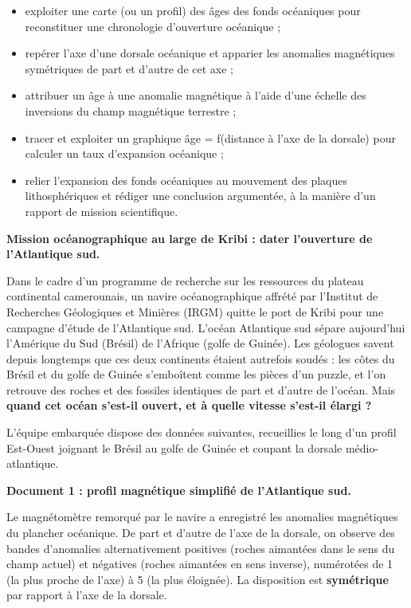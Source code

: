 \documentclass[11pt]{article}
\newcounter{popsec}
\newcounter{popsub}
\newcommand{\courssub}[1]{%
  \stepcounter{popsub}%
  \par\vspace{9pt}\noindent{\popxbold\fontsize{11.5}{13}\selectfont\color{popink}{\color{poporange}\thepopsec.\thepopsub}\hspace{6pt}#1}\par\nopagebreak\vspace{4pt}
}
\begin{document}
\begin{itemize}
\item exploiter une carte (ou un profil) des âges des fonds océaniques pour reconstituer une chronologie d'ouverture océanique ;
\item repérer l'axe d'une dorsale océanique et apparier les anomalies magnétiques symétriques de part et d'autre de cet axe ;
\item attribuer un âge à une anomalie magnétique à l'aide d'une échelle des inversions du champ magnétique terrestre ;
\item tracer et exploiter un graphique âge = f(distance à l'axe de la dorsale) pour calculer un taux d'expansion océanique ;
\item relier l'expansion des fonds océaniques au mouvement des plaques lithosphériques et rédiger une conclusion argumentée, à la manière d'un rapport de mission scientifique.
\end{itemize}

\courssub{Situation}

\textbf{Mission océanographique au large de Kribi : dater l'ouverture de l'Atlantique sud.}

Dans le cadre d'un programme de recherche sur les ressources du plateau continental camerounais, un navire océanographique affrété par l'Institut de Recherches Géologiques et Minières (IRGM) quitte le port de Kribi pour une campagne d'étude de l'Atlantique sud. L'océan Atlantique sud sépare aujourd'hui l'Amérique du Sud (Brésil) de l'Afrique (golfe de Guinée). Les géologues savent depuis longtemps que ces deux continents étaient autrefois soudés : les côtes du Brésil et du golfe de Guinée s'emboîtent comme les pièces d'un puzzle, et l'on retrouve des roches et des fossiles identiques de part et d'autre de l'océan. Mais \textbf{quand cet océan s'est-il ouvert, et à quelle vitesse s'est-il élargi ?}

L'équipe embarquée dispose des données suivantes, recueillies le long d'un profil Est-Ouest joignant le Brésil au golfe de Guinée et coupant la dorsale médio-atlantique.

\textbf{Document 1 : profil magnétique simplifié de l'Atlantique sud.}

Le magnétomètre remorqué par le navire a enregistré les anomalies magnétiques du plancher océanique. De part et d'autre de l'axe de la dorsale, on observe des bandes d'anomalies alternativement positives (roches aimantées dans le sens du champ actuel) et négatives (roches aimantées en sens inverse), numérotées de 1 (la plus proche de l'axe) à 5 (la plus éloignée). La disposition est \textbf{symétrique} par rapport à l'axe de la dorsale.
\end{document}
